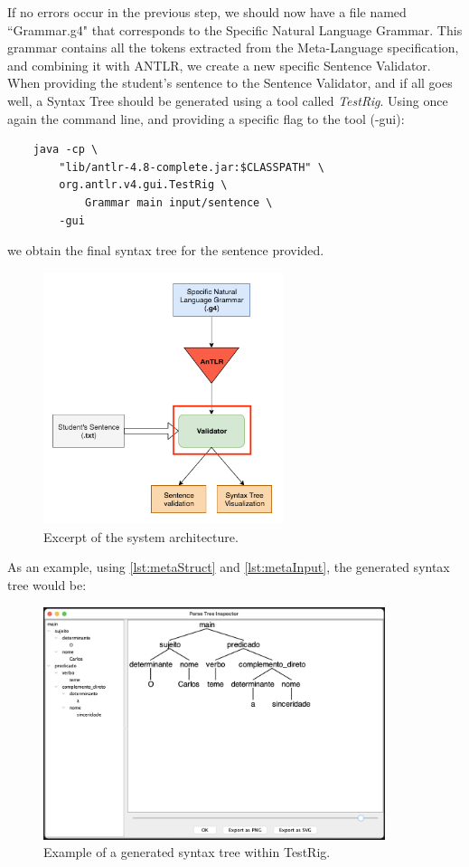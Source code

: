 If no errors occur in the previous step, we should now have a file named ``Grammar.g4" that corresponds to the Specific Natural Language Grammar.
This grammar contains all the tokens extracted from the Meta-Language specification, and combining it with ANTLR, we create a new specific Sentence Validator.
When providing the student's sentence to the Sentence Validator, and if all goes well, a Syntax Tree should be generated using a tool called \emph{TestRig}.
Using once again the command line, and providing a specific flag to the tool (-gui):
\begin{Verbatim}
	java -cp \ 
		"lib/antlr-4.8-complete.jar:$CLASSPATH" \ 
		org.antlr.v4.gui.TestRig \ 
			Grammar main input/sentence \ 
		-gui
\end{Verbatim}
\noindent we obtain the final syntax tree for the sentence provided. 
\begin{figure}[h]
    \centering
    \includegraphics[width=7cm]{images/system_sentence_validator.png}
    \caption{Excerpt of the system architecture.}
    \label{fig:systemSentenceValidator}
\end{figure}

As an example, using \autoref{lst:metaStruct} and \autoref{lst:metaInput}, the generated syntax tree would be:
\begin{figure}[h]
    \centering
    \includegraphics[width=10cm]{images/testrig_gui_example.png}
    \caption{Example of a generated syntax tree within TestRig.}
    \label{fig:testrigGuiExample}
\end{figure}


